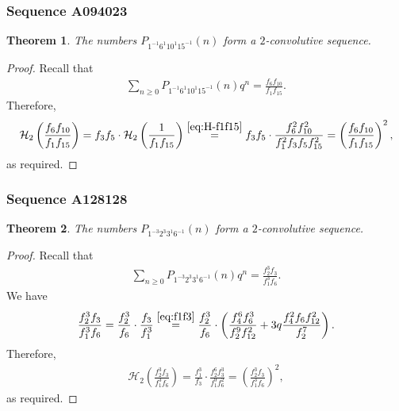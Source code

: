 \documentclass[12pt,reqno]{amsart}
\numberwithin{equation}{section}
\theoremstyle{plain}
\newtheorem{theorem}{Theorem}[section]
\theoremstyle{definition}
\theoremstyle{named}
\newcommand{\HH}{\mathcal{H}}
\begin{document}
\subsubsection{Sequence A094023}

\begin{theorem}\label{th:A094023}
	The numbers $P_{1^{-1} 6^1 10^{1} 15^{-1}}(n)$ form a $2$-convolutive sequence.
\end{theorem}

\begin{proof}
	Recall that
	\begin{align*}
		\sum_{n\ge 0} P_{1^{-1} 6^1 10^{1} 15^{-1}}(n) q^n = \frac{f_6 f_{10}}{f_1 f_{15}}.
	\end{align*}
	Therefore,
	\begin{align*}
		\HH_2\left(\frac{f_6 f_{10}}{f_1 f_{15}}\right) = f_3 f_5\cdot \HH_2\left(\frac{1}{f_1 f_{15}}\right) \overset{\eqref{eq:H-f1f15}}{=} f_3 f_5\cdot \frac{f_{6}^2f_{10}^2}{f_1^2f_3f_{5}f_{15}^2} = \left(\frac{f_6 f_{10}}{f_1 f_{15}}\right)^2,
	\end{align*}
	as required.
\end{proof}

\subsubsection{Sequence A128128}

\begin{theorem}\label{th:A128128}
	The numbers $P_{1^{-3} 2^3 3^{1} 6^{-1}}(n)$ form a $2$-convolutive sequence.
\end{theorem}

\begin{proof}
	Recall that
	\begin{align*}
		\sum_{n\ge 0} P_{1^{-3} 2^3 3^{1} 6^{-1}}(n) q^n = \frac{f_2^3 f_{3}}{f_1^3 f_{6}}.
	\end{align*}
	We have
	\begin{align*}
		\frac{f_2^3 f_{3}}{f_1^3 f_{6}} = \frac{f_2^3}{f_{6}}\cdot \frac{f_{3}}{f_1^3} \overset{\eqref{eq:f1f3}}{=} \frac{f_2^3}{f_{6}}\cdot \left(\frac{f_4^6f_6^3}{f_2^9f_{12}^2}+3q\frac{f_4^2f_6f_{12}^2}{f_2^7}\right).
	\end{align*}
	Therefore,
	\begin{align*}
		\HH_2\left(\frac{f_2^3 f_{3}}{f_1^3 f_{6}}\right) = \frac{f_1^3}{f_{3}}\cdot \frac{f_2^6f_3^3}{f_1^9f_{6}^2} = \left(\frac{f_2^3 f_{3}}{f_1^3 f_{6}}\right)^2,
	\end{align*}
	as required.
\end{proof}
\end{document}
